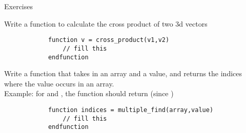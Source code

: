\begin{frame}[fragile]{Exercises}
    \small
    \vspace{-1em}
    \begin{exercise}
        Write a function to calculate the cross product of two 3d vectors
        \begin{lstlisting}
            function v = cross_product(v1,v2)
                // fill this
            endfunction
        \end{lstlisting}
    \end{exercise}
    \begin{exercise}
        Write a function that takes in an array and a value, and returns the indices where the value occurs in an array.\\
        Example: for  and , the function should return \inlinecode{[2,6]} (since )
        \begin{lstlisting}
            function indices = multiple_find(array,value)
                // fill this
            endfunction
        \end{lstlisting}
    \end{exercise}
\end{frame}

